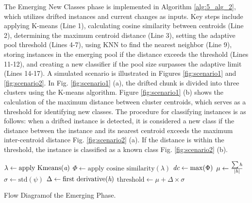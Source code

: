 The Emerging New Classes phase is implemented in Algorithm \ref{alg:5_alg_2}, which utilizes drifted instances and current changes as inputs. Key steps include applying K-means (Line 1), calculating cosine similarity between centroids (Line 2), determining the maximum centroid distance (Line 3), setting the adaptive pool threshold (Lines 4-7), using KNN to find the nearest neighbor (Line 9), storing instances in the emerging pool if the distance exceeds the threshold (Lines 11-12), and creating a new classifier if the pool size surpasses the adaptive limit (Lines 14-17). A simulated scenario is illustrated in Figures  \ref{fig:scenario1} and  \ref{fig:scenario2}. In Fig. \ref{fig:scenario1} (a), the drifted chunk is divided into three clusters using the K-means algorithm. Figure \ref{fig:scenario1} (b) shows the calculation of the maximum distance between cluster centroids, which serves as a threshold for identifying new classes. The procedure for classifying instances is as follows: when a drifted instance is detected, it is considered a new class if the distance between the instance and its nearest centroid exceeds the maximum inter-centroid distance Fig. \ref{fig:scenario2} (a). If the distance is within the threshold, the instance is classified as a known class Fig. \ref{fig:scenario2} (b).

\begin{algorithm}[H]
	\SetAlgoLined
	\DontPrintSemicolon
	$\lambda \gets \text{apply Kmeans}(\emph{a})$\;
	$\Phi \gets \text{apply cosine similarity}(\lambda)$\;
	$\emph{dc} \gets \max(\Phi)$\;
	$\mu \gets \frac{\sum \emph{h}}{|\emph{h}|}$\;
	$\sigma \gets \text{std}(\psi)$\;
	$\Delta \gets \text{first derivative}(\emph{h})$\;
	$\text{threshold} \gets \mu + \Delta \times \sigma$\;

	\;
	\caption{Flow  Diagramof the Emerging Phase.}
	\label{alg:5_alg_2}

\end{algorithm}
